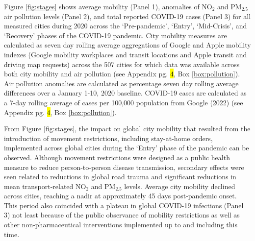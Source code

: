 \documentclass[preprint,10pt]{elsarticle} %
\begin{document}
Figure \ref{fig:stages} shows average mobility (Panel 1), anomalies of NO$_{2}$ and PM$_{2.5}$ air pollution levels (Panel 2), and total reported COVID-19 cases (Panel 3) for all measured cities during 2020 across the `Pre-pandemic', `Entry', `Mid-Crisis', and `Recovery' phases of the COVID-19 pandemic. City mobility measures are calculated as seven day rolling average aggregations of Google and Apple mobility indexes (Google mobility workplaces and transit locations and Apple transit and driving map requests) across the 507 cities for which data was available across both city mobility and air pollution (see Appendix pg. \hl{4}, Box \ref{box:pollution}). Air pollution anomalies are calculated as percentage seven day rolling average differences over a January 1-10, 2020 baseline. COVID-19 cases are calculated as a 7-day rolling average of cases per 100,000 population from Google (2022)\cite{Google2022} (see Appendix pg. \hl{4}, Box \ref{box:pollution}).

From Figure \ref{fig:stages}, the impact on global city mobility that resulted from the introduction of movement restrictions, including stay-at-home orders, implemented across global cities during the `Entry' phase\cite{hale2021global} of the pandemic can be observed. Although movement restrictions were designed as a public health measure to reduce person-to-person disease transmission, secondary effects were seen related to reductions in global road trauma \cite{ITFRS2023} and significant reductions in mean transport-related NO$_{2}$ and PM$_{2.5}$ levels\cite{zhang2023impact}. Average city mobility declined across cities, reaching a nadir at approximately 45 days post-pandemic onset. This period also coincided with a plateau in global COVID-19 infections (Panel 3) not least because of the public observance of mobility restrictions as well as other non-pharmaceutical interventions implemented up to and including this time\cite{hale2021global}. 
\end{document}
